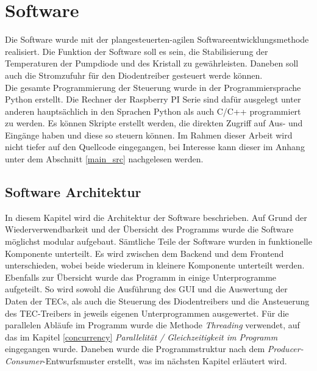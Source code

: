\section{Software}
\label{chptr:software}
Die Software wurde mit der plangesteuerten-agilen Softwareentwicklungsmethode realisiert. 
Die Funktion der Software soll es sein, die Stabilisierung der Temperaturen der Pumpdiode und des Kristall zu gewährleisten. Daneben soll auch die Stromzufuhr für den Diodentreiber gesteuert werde können.\\
Die gesamte Programmierung der Steuerung wurde in der Programmiersprache Python erstellt. Die Rechner der Raspberry PI Serie sind dafür ausgelegt unter anderen hauptsächlich in den Sprachen Python als auch C/C++ programmiert zu werden. Es können Skripte erstellt werden, die direkten Zugriff auf Aus- und Eingänge haben und diese so steuern können. Im Rahmen dieser Arbeit wird nicht tiefer auf den Quellcode eingegangen, bei Interesse kann dieser im Anhang unter dem Abschnitt \ref{main_src} nachgelesen werden.\\


\subsection{Software Architektur}
\label{lab_software_architecture}
In diesem Kapitel wird die Architektur der Software beschrieben. Auf Grund der Wiederverwendbarkeit und der Übersicht des Programms wurde die Software möglichst modular aufgebaut. Sämtliche Teile der Software wurden in funktionelle Komponente unterteilt. Es wird zwischen dem Backend und dem Frontend unterschieden, wobei beide wiederum in kleinere Komponente unterteilt werden. Ebenfalls zur Übersicht wurde das Programm in einige Unterprogramme aufgeteilt. So wird sowohl die Ausführung des GUI und die Auswertung der Daten der TECs, als auch die Steuerung des Diodentreibers und die Ansteuerung des TEC-Treibers in jeweils eigenen Unterprogrammen ausgewertet. Für die parallelen Abläufe im Programm wurde die Methode \textit{Threading} verwendet, auf das im Kapitel \ref{concurrency} \textit{Parallelität / Gleichzeitigkeit im Programm} eingegangen wurde. Daneben wurde die Programmstruktur nach dem \textit{Producer-Consumer}-Entwurfsmuster erstellt, was im nächsten Kapitel erläutert wird.


